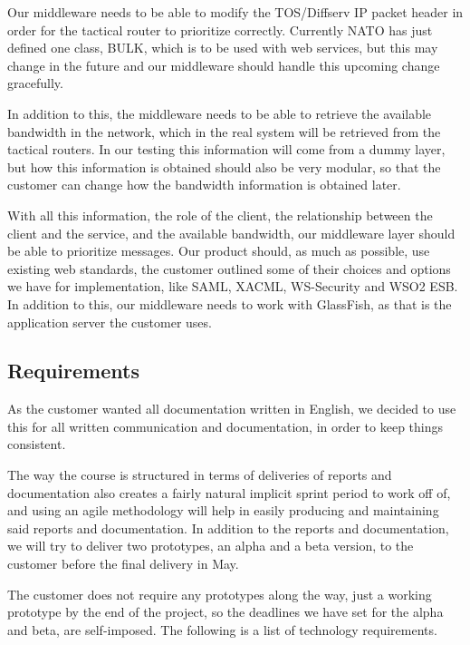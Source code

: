 \documentclass[12pt]{article}
\begin{document}
    Our middleware needs to be able to modify the TOS/Diffserv IP packet header in order for the tactical router to prioritize correctly. Currently NATO has just defined one class, BULK, which is to be used with web services, but this may change in the future and our middleware should handle this upcoming change gracefully.

    In addition to this, the middleware needs to be able to retrieve the available bandwidth in the network, which in the real system will be retrieved from the tactical routers. In our testing this information will come from a dummy layer, but how this information is obtained should also be very modular, so that the customer can change how the bandwidth information is obtained later.

    With all this information, the role of the client, the relationship between the client and the service, and the available bandwidth, our middleware layer should be able to prioritize messages. Our product should, as much as possible, use existing web standards, the customer outlined some of their choices and options we have for implementation, like SAML, XACML, WS-Security and WSO2 ESB. In addition to this, our middleware needs to work with GlassFish, as that is the application server the customer uses.
   
    \subsection{Requirements}\label{taskreq}
    As the customer wanted all documentation written in English, we decided to use this for all written communication and documentation, in order to keep things consistent.
    
    The way the course is structured in terms of deliveries of reports and documentation also creates a fairly natural implicit sprint period to work off of, and using an agile methodology will help in easily producing and maintaining said reports and documentation. In addition to the  reports and documentation, we will try to deliver two prototypes, an alpha and a beta version, to the customer before the final delivery in May.
    
        The customer does not require any prototypes along the way, just a working prototype by the end of the project, so the deadlines we have set for the alpha and beta, are self-imposed. The following is a list of technology requirements. 
    
\end{document}

